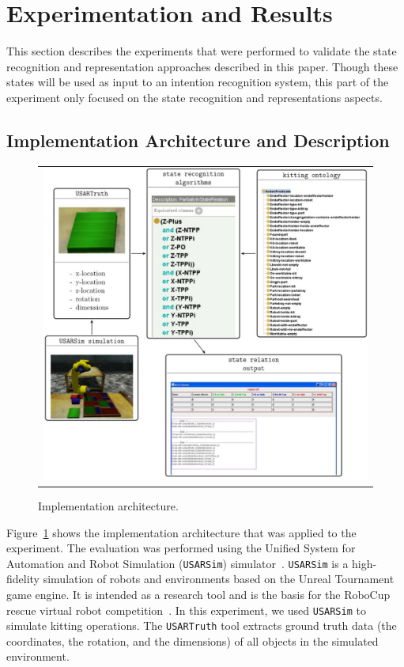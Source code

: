 \documentclass[preprint,12pt]{elsarticle}
\begin{document}
\section{Experimentation and Results}\label{S:section5}

This section describes the experiments that were performed to validate the state recognition and representation approaches described in this paper. Though these states will be used as input to an intention recognition system, this part of the experiment only focused on the state recognition and representations aspects.

\subsection{Implementation Architecture and Description}

\begin{figure}[t!h!]
\begin{tabular}{c}
\includegraphics[width=13cm]{architecture.pdf}
\end{tabular}
\caption{Implementation architecture.}
\label{fig:architecture}
\end{figure}
Figure~\ref{fig:architecture} shows the implementation architecture that was applied to the experiment. The evaluation was performed using the Unified System for Automation and Robot Simulation (\texttt{USARSim}) simulator~\cite{Carpin.ICRA.2007}. \texttt{USARSim} is a high-fidelity simulation of robots and environments based on the Unreal Tournament game engine. It is intended as a research tool and is the basis for the RoboCup rescue virtual robot competition~\cite{Kitano.ICAA.1997}. In this experiment, we used \texttt{USARSim} to simulate kitting operations. The \texttt{USARTruth} tool extracts ground truth data (the coordinates, the rotation, and the dimensions) of all objects in the simulated environment.
\end{document}
